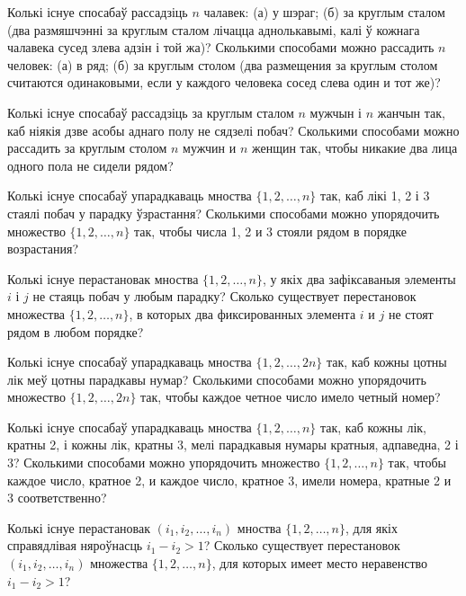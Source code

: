 \documentclass[12pt, a4paper]{article}
\begin{document}
\begin{problemList}
\problemItemSimple
{Колькі існуе спосабаў рассадзіць $n$ чалавек: (а) у шэраг;
(б) за круглым сталом (два размяшчэнні за круглым сталом лічацца аднолькавымі,
калі ў кожнага чалавека сусед злева адзін і той жа)?}
{Сколькими способами можно рассадить $n$ человек: (а) в ряд; (б) за
круглым столом (два размещения за круглым столом считаются
одинаковыми, если у каждого человека сосед слева один и тот же)?}

\bigskip

\problemItemSimple
{Колькі існуе спосабаў рассадзіць за круглым сталом $n$ мужчын і $n$ жанчын так,
каб ніякія дзве асобы аднаго полу не сядзелі побач?}
{Сколькими способами можно рассадить за круглым столом $n$ мужчин и
$n$ женщин так, чтобы никакие два лица одного пола не сидели рядом?}

\bigskip

\problemItemSimple
{Колькі існуе спосабаў упарадкаваць мноства $\{1, 2, \ldots, n\}$ так,
каб лікі 1, 2 і 3 стаялі побач у парадку ўзрастання?}
{Сколькими способами можно упорядочить множество $\{1, 2, \ldots, n\}$
так, чтобы числа 1, 2 и 3 стояли рядом в порядке возрастания?}

\bigskip

\problemItemSimple
{Колькі існуе перастановак мноства $\{1, 2, \ldots, n\}$, у якіх два зафіксаваныя
элементы $i$ і $j$ не стаяць побач у любым парадку?}
{Сколько существует перестановок множества $\{1, 2, \ldots, n\}$, в
которых два фиксированных элемента $i$ и $j$ не стоят рядом в любом
порядке?}

\bigskip

\problemItemSimple
{Колькі існуе спосабаў упарадкаваць мноства $\{1, 2, \ldots, 2n\}$ так,
каб кожны цотны лік меў цотны парадкавы нумар?}
{Сколькими способами можно упорядочить множество $\{1, 2, \ldots, 2n\}$
так, чтобы каждое четное число имело четный номер?}

\bigskip

\problemItemSimple
{Колькі існуе спосабаў упарадкаваць мноства $\{1, 2, \ldots, n\}$ так,
каб кожны лік, кратны 2, і кожны лік, кратны 3, мелі парадкавыя нумары кратныя,
адпаведна, 2 і 3?}
{Сколькими способами можно упорядочить множество $\{1, 2, \ldots, n\}$
так, чтобы каждое число, кратное 2, и каждое число, кратное 3, имели
номера, кратные 2 и 3 соответственно?}

\bigskip

\problemItemSimple
{Колькі існуе перастановак $(i_1, i_2, \ldots, i_n)$ мноства $\{1, 2, \ldots, n\}$,
для якіх справядлівая няроўнасць $i_1 - i_2 > 1$?}
{Сколько существует перестановок $(i_1, i_2, \ldots, i_n)$ множества
$\{1, 2, \ldots, n\}$, для которых имеет место неравенство
$i_1 - i_2 > 1$?}

\end{problemList}
\end{document}
